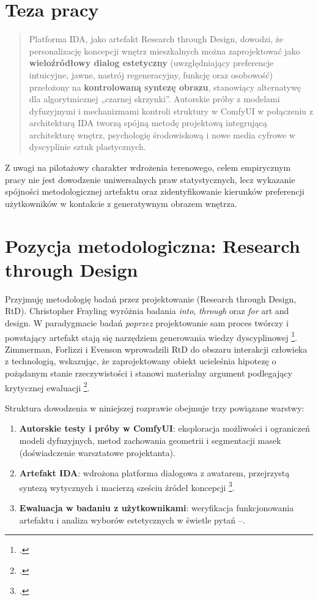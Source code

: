 \section{Teza pracy}
\label{ch01:sec:teza}

\begin{quote}
Platforma IDA, jako artefakt Research through Design, dowodzi, że personalizację koncepcji wnętrz mieszkalnych można zaprojektować jako \textbf{wieloźródłowy dialog estetyczny} (uwzględniający preferencje intuicyjne, jawne, nastrój regeneracyjny, funkcję oraz osobowość) przełożony na \textbf{kontrolowaną syntezę obrazu}, stanowiący alternatywę dla algorytmicznej „czarnej skrzynki”.
Autorskie próby z modelami dyfuzyjnymi i mechanizmami kontroli struktury w ComfyUI w połączeniu z architekturą IDA tworzą spójną metodę projektową integrującą architekturę wnętrz, psychologię środowiskową i nowe media cyfrowe w dyscyplinie sztuk plastycznych.
\end{quote}

Z uwagi na pilotażowy charakter wdrożenia terenowego, celem empirycznym pracy nie jest dowodzenie uniwersalnych praw statystycznych, lecz wykazanie spójności metodologicznej artefaktu oraz zidentyfikowanie kierunków preferencji użytkowników w kontakcie z generatywnym obrazem wnętrza.

\section{Pozycja metodologiczna: Research through Design}
\label{ch01:sec:rtd}

Przyjmuję metodologię badań przez projektowanie (Research through Design, RtD).
Christopher Frayling wyróżnia badania \emph{into}, \emph{through} oraz \emph{for} art and design. W paradygmacie badań \emph{poprzez} projektowanie sam proces twórczy i powstający artefakt stają się narzędziem generowania wiedzy dyscyplinowej \footcite{frayling1993research}.
Zimmerman, Forlizzi i Evenson wprowadzili RtD do obszaru interakcji człowieka z technologią, wskazując, że zaprojektowany obiekt ucieleśnia hipotezę o pożądanym stanie rzeczywistości i stanowi materialny argument podlegający krytycznej ewaluacji \footcite{zimmerman2007rtd}.

Struktura dowodzenia w niniejszej rozprawie obejmuje trzy powiązane warstwy:
\begin{enumerate}
  \item[(A)] \textbf{Autorskie testy i próby w ComfyUI}: eksploracja możliwości i ograniczeń modeli dyfuzyjnych, metod zachowania geometrii i segmentacji masek (doświadczenie warsztatowe projektanta).
  \item[(B)] \textbf{Artefakt IDA}: wdrożona platforma dialogowa z awatarem, przejrzystą syntezą wytycznych i macierzą sześciu źródeł koncepcji \footcite{idaPlatform2026}.
  \item[(C)] \textbf{Ewaluacja w badaniu z użytkownikami}: weryfikacja funkcjonowania artefaktu i analiza wyborów estetycznych w świetle pytań --.
\end{enumerate}


